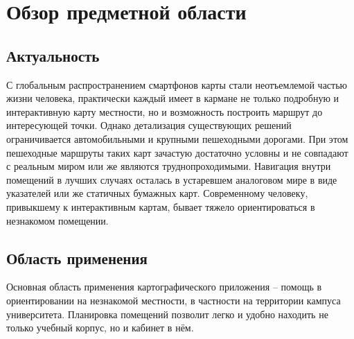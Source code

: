 \chapter{Обзор предметной области}
  \section{Актуальность}
    С глобальным распространением смартфонов карты стали неотъемлемой частью жизни человека, практически каждый имеет в кармане не только подробную и интерактивную карту местности, но и возможность построить маршрут до интересующей точки. Однако детализация существующих решений ограничивается автомобильными и крупными пешеходными дорогами. При этом пешеходные маршруты таких карт зачастую достаточно условны и не совпадают с реальным миром или же являются труднопроходимыми.
    Навигация внутри помещений в лучших случаях осталась в устаревшем аналоговом мире в виде указателей или же статичных бумажных карт. Современному человеку, привыкшему к интерактивным картам, бывает тяжело ориентироваться в незнакомом помещении.


  \section{Область применения}
    Основная область применения картографического приложения -- помощь в ориентировании на незнакомой местности, в частности на территории кампуса университета. Планировка помещений позволит легко и удобно находить не только учебный корпус, но и кабинет в нём.


